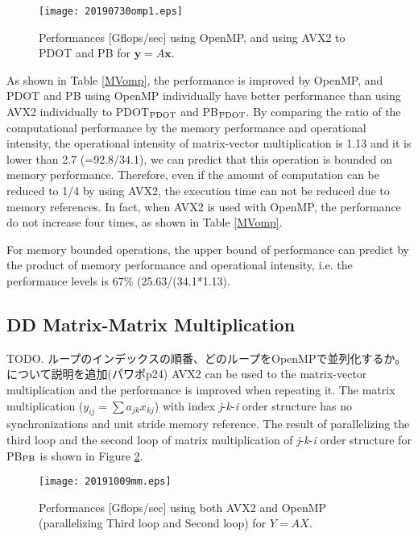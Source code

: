 \documentclass{IOS-Book-Article}
\begin{document}
\begin{figure}[htbp]
  \begin{center}
    \texttt{[image: 20190730omp1.eps]}
        \caption{Performances [Gflops/sec] using OpenMP, and using AVX2 to PDOT and PB for $\bm{y} = A\bm{x}$.}
    \label{figMM}
  \end{center}
\end{figure}


As shown in Table \ref{MVomp}, the performance is improved by OpenMP, and PDOT and PB using OpenMP individually have better performance than using AVX2 individually to PDOT$_{\rm{PDOT}}$ and PB$_{\rm{PDOT}}$. 
By comparing the ratio of the computational performance by the memory performance and operational intensity, the operational intensity of matrix-vector multiplication is 1.13 and it is lower than 2.7 (=92.8/34.1), we can predict that this operation is bounded on memory performance.
Therefore, even if the amount of computation can be reduced to 1/4 by using AVX2, the execution time can not be reduced due to memory references. 
In fact, when AVX2 is used with OpenMP, the performance do not increase four times, as shown in Table \ref{MVomp}.

For memory bounded operations, the upper bound of performance can predict by the product of memory performance and operational intensity, i.e. the performance levels is 67\% (25.63/(34.1*1.13).



\subsection{DD Matrix-Matrix Multiplication}
TODO. ループのインデックスの順番、どのループをOpenMPで並列化するか。について説明を追加(パワポp24)
AVX2 can be used to the matrix-vector multiplication and the performance is improved when repeating it. The matrix multiplication ($y_{ij}=\sum a_{jk}x_{kj}$) with index {\it j}-{\it k}-{\it i} order structure has no synchronizations and unit stride memory reference.
The result of parallelizing the third loop and the second loop of matrix multiplication of {\it j}-{\it k}-{\it i} order structure for PB$_{\rm{PB}}$ is shown in Figure \ref{figMM3}.

\begin{figure}[htbp]
  \begin{center}
    \texttt{[image: 20191009mm.eps]}
         \caption{Performances [Gflops/sec] using both AVX2 and OpenMP (parallelizing Third loop and Second loop) for $Y = AX$.}
    \label{figMM3}
  \end{center}
\end{figure}
\end{document}
